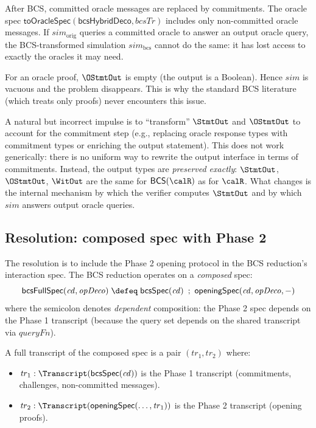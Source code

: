 After BCS, committed oracle messages are replaced by commitments.
The oracle spec $\mathsf{toOracleSpec}(\mathsf{bcsHybridDeco},
\mathit{bcsTr})$ includes only non-committed oracle messages.
If $\mathit{sim}_{\mathrm{orig}}$ queries a committed oracle to answer an
output oracle query, the BCS-transformed simulation
$\mathit{sim}_{\mathrm{bcs}}$ cannot do the same: it has lost access to
exactly the oracles it may need.

\begin{remark}
  For an oracle proof, $\OStmtOut$ is empty (the output is a Boolean).
  Hence $\mathit{sim}$ is vacuous and the problem disappears.
  This is why the standard BCS literature (which treats only proofs)
  never encounters this issue.
\end{remark}

A natural but incorrect impulse is to ``transform'' $\StmtOut$ and
$\OStmtOut$ to account for the commitment step (e.g., replacing oracle
response types with commitment types or enriching the output statement).
This does not work generically: there is no uniform way to rewrite the
output interface in terms of commitments.
Instead, the output types are \emph{preserved exactly}: $\StmtOut$,
$\OStmtOut$, $\WitOut$ are the same for $\mathsf{BCS}(\calR)$ as for
$\calR$.
What changes is the internal mechanism by which the verifier computes
$\StmtOut$ and by which $\mathit{sim}$ answers output oracle queries.

\subsection{Resolution: composed spec with Phase 2}

The resolution is to include the Phase 2 opening protocol in the BCS
reduction's interaction spec.
The BCS reduction operates on a \emph{composed} spec:
\[
  \mathsf{bcsFullSpec}(\mathit{cd}, \mathit{opDeco})
  \;\defeq\;
  \mathsf{bcsSpec}(\mathit{cd})
  \;\mathbin{;}\;
  \mathsf{openingSpec}(\mathit{cd}, \mathit{opDeco}, -)
\]
where the semicolon denotes \emph{dependent} composition: the Phase 2 spec
depends on the Phase 1 transcript (because the query set depends on the
shared transcript via $\mathit{queryFn}$).

A full transcript of the composed spec is a pair
$(\mathit{tr}_1, \mathit{tr}_2)$ where:
\begin{itemize}
  \item $\mathit{tr}_1 : \Transcript(\mathsf{bcsSpec}(\mathit{cd}))$
    is the Phase 1 transcript (commitments, challenges, non-committed
    messages).
  \item $\mathit{tr}_2 : \Transcript(\mathsf{openingSpec}(\ldots,
    \mathit{tr}_1))$ is the Phase 2 transcript (opening proofs).
\end{itemize}

